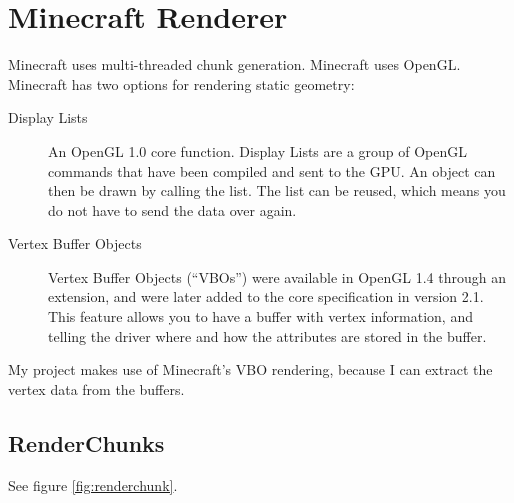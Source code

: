 \documentclass[]{article}
\begin{document}
\section{Minecraft Renderer}
Minecraft uses multi-threaded chunk generation.
Minecraft uses OpenGL.
Minecraft has two options for rendering static geometry:
\begin{description}
  \item[Display Lists] An OpenGL 1.0 core function.
    Display Lists are a group of OpenGL commands that have been compiled and sent to the GPU.
    An object can then be drawn by calling the list.
    The list can be reused, which means you do not have to send the data over again.
  \item[Vertex Buffer Objects] Vertex Buffer Objects (\enquote{VBOs}) were available in OpenGL 1.4 through an extension, and were later added to the core specification in version 2.1.
    This feature allows you to have a buffer with vertex information, and telling the driver where and how the attributes are stored in the buffer.
\end{description}
My project makes use of Minecraft's VBO rendering, because I can extract the vertex data from the buffers.

\subsection{RenderChunks}
See figure \ref{fig:renderchunk}.
\end{document}

